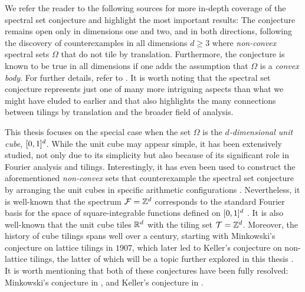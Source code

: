\documentclass[../thesis.tex]{subfiles}
\begin{document}
We refer the reader to the following sources for more in-depth coverage of the spectral set conjecture and highlight the most important results: The conjecture remains open only in dimensions one and two, and in both directions, following the discovery of counterexamples in all dimensions $d \geq 3$ where \emph{non-convex} spectral sets $\Omega$ that do not tile by translation. Furthermore, the conjecture is known to be true in all dimensions if one adds the assumption that $\Omega$ is a \emph{convex body}. For further details, refer to \cite{levFugledeConjectureConvex2022,dutkayReductionsSpectralSet2014,liDualityPropertiesSpectra2010,farkasFugledeConjectureExistence2006,kolountzakisStudyTranslationalTiling2003,jorgensenSpectralPairsCartesian2001}. It is worth noting that the spectral set conjecture represents just one of many more intriguing aspects than what we might have eluded to earlier and that \cite{kolountzakisStudyTranslationalTiling2003} also highlights the many connections between tilings by translation and the broader field of  analysis. 

This thesis focuses on the special case when the set $\Omega$ is the \emph{$d$-dimensional unit cube}, $[0,1]^d$. While the unit cube may appear simple, it has been extensively studied, not only due to its simplicity but also because of its significant role in Fourier analysis and tilings. Interestingly, it has even been used to construct the aforementioned \emph{non-convex} sets that counterexample the spectral set conjecture by arranging the unit cubes in specific arithmetic configurations \cite{levFugledeConjectureConvex2022}. Nevertheless, it is well-known that the spectrum $\mathcal{F}=\mathbb{Z}^d$ corresponds to the standard Fourier basis for the space of square-integrable functions defined on $[0,1]^d$ \cite{lagariasOrthonormalBasesExponentials2000}. It is also well-known that the unit cube tiles $\mathbb{R}^d$ with the tiling set $\mathcal{T}=\mathbb{Z}^d$. Moreover, the history of cube tilings spans well over a century, starting with Minkowski's conjecture on lattice tilings in $1907$, which later led to Keller's conjecture on non-lattice tilings, the latter of which will be a topic further explored in this thesis \cite{liDualityPropertiesSpectra2010,iosevichSpectralTilingProperties1998}. It is worth mentioning that both of these conjectures have been fully resolved: Minkowski's conjecture in \cite{hajsBerEinfacheUnd1942}, and Keller's conjecture in \cite{brakensiekResolutionKellerConjecture2020}.
\end{document}
